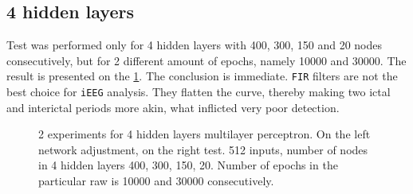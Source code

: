 \subsection{4 hidden layers}
Test was performed only for 4 hidden layers with 400, 300, 150 and 20 nodes consecutively, but for 2 different amount of epochs, namely 10000 and 30000. The result is presented on the \figurename{} \ref{fig:nn_fir_4_hidden_512_400_300_150_20_1_10000_30000}. The conclusion is immediate. \verb|FIR| filters are not the best choice for \verb|iEEG| analysis. They flatten the curve, thereby making two ictal and interictal periods more akin, what inflicted very poor detection. 
\begin{figure}[H]
	\begin{center}
	\end{center}
	\caption{2 experiments for 4 hidden layers multilayer perceptron. On the left network adjustment, on the right test. 512 inputs, number of nodes in 4 hidden layers 400, 300, 150, 20. Number of epochs in the particular raw is 10000 and 30000 consecutively.}

	\label{fig:nn_fir_4_hidden_512_400_300_150_20_1_10000_30000}
\end{figure}
\begingroup
\renewcommand{\cleardoublepage}{}
\renewcommand{\clearpage}{}
